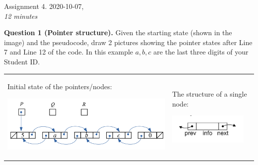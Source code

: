 \documentclass[a4paper,12pt]{article}
\begin{document}

\thispagestyle{empty}

\begin{center}
{\Large Assignment 4. 2020-10-07},\\
{\em 12 minutes} 
\end{center}

\noindent


{\bf Question 1 (Pointer structure).} Given the starting state 
(shown in the image) and the pseudocode, draw 2 pictures 
showing the pointer states after Line 7 and Line 12 of the code.
In this example $a,b,c$ are the last three digits of your Student ID.

\vspace{10pt}
\begin{tabular}[t]{@{}ll@{}} 
\begin{minipage}[t]{0.68\columnwidth}
Initial state of the pointers/nodes:
\begin{center}
\includegraphics[width=4in]{assignment04-pointers/assignment4-nodes.png}
\end{center}

\end{minipage} &
\begin{minipage}[t]{0.25\columnwidth}

The structure of a single node:

\begin{center}
\includegraphics[width=1.5in]{assignment04-pointers/sample-assignment04-structure.png}
\end{center}


\end{minipage}
\end{tabular}
\end{document}
